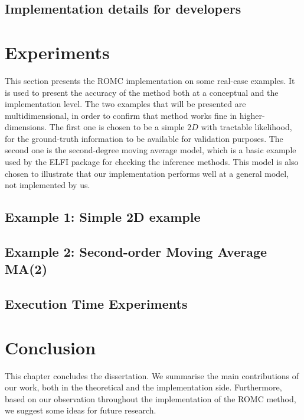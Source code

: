 \documentclass[11pt,twoside]{article}
\numberwithin{Theorem}{section}
\numberwithin{Definition}{section}
\numberwithin{Lemma}{section}
\numberwithin{Algorithm}{section}
\numberwithin{equation}{section}
\begin{document}
\subsection{Implementation details for developers}
\label{subsec:developers}



\clearpage
\section{Experiments}
This section presents the ROMC implementation on some real-case
examples. It is used to present the accuracy of the method both at a
conceptual and the implementation level. The two examples that will be
presented are multidimensional, in order to confirm that method works
fine in higher-dimensions. The first one is chosen to be a simple $2D$
with tractable likelihood, for the ground-truth information to be
available for validation purposes. The second one is the second-degree
moving average model, which is a basic example used by the ELFI
package for checking the inference methods. This model is also chosen
to illustrate that our implementation performs well at a general
model, not implemented by us.

\subsection{Example 1: Simple 2D example}
\label{subsec:ex1}


\subsection{Example 2: Second-order Moving Average MA(2)}
\label{subsec:ma2}


\subsection{Execution Time Experiments}
\label{subsec:exec}


\section{Conclusion}

This chapter concludes the dissertation. We summarise the main contributions of our work, both in the theoretical and the implementation side. Furthermore, based on our observation throughout the implementation of the ROMC method, we suggest some ideas for future research.
\end{document}
